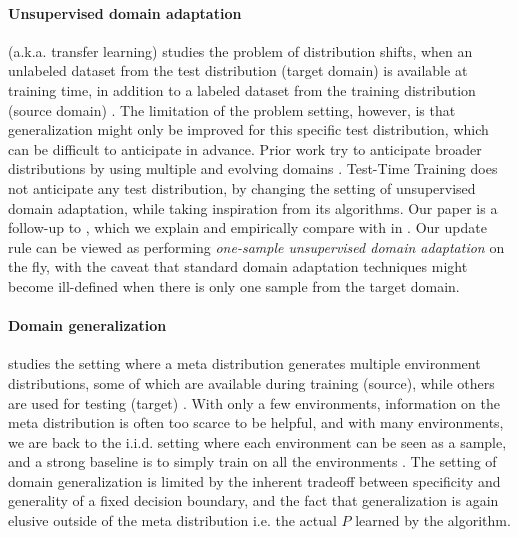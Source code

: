 \paragraph{Unsupervised domain adaptation}
(a.k.a. transfer learning) studies the problem of distribution shifts, when an unlabeled dataset from the test distribution (target domain) is available at training time, 
in addition to a labeled dataset from the training distribution (source domain)
\citep{chen2011co, gong2012geodesic, long2015learning, ganin2016domain, long2016unsupervised, tzeng2017adversarial,hoffman2017cycada,csurka2017domain, chen2018adversarial}.
The limitation of the problem setting, however, is that generalization might only be improved for this specific test distribution, which can be difficult to anticipate in advance.
Prior work try to anticipate broader distributions by using multiple and evolving domains \citep{hoffman2018algorithms, hoffman2012discovering, hoffman2014continuous}.
Test-Time Training does not anticipate any test distribution, by changing the setting of unsupervised domain adaptation, while taking inspiration from its algorithms.
Our paper is a follow-up to \citet{sun2019uda}, which we explain and empirically compare with in .
Our update rule can be viewed as performing \emph{one-sample unsupervised domain adaptation} on the fly, with the caveat that standard domain adaptation techniques might become ill-defined when there is only one sample from the target domain.

\paragraph{Domain generalization} studies the setting where a meta distribution generates multiple environment distributions, some of which are available during training (source), while others are used for testing (target)
\citep{li2018deep, shankar2018generalizing, muandet2013domain, balaji2018metareg, ghifary2015domain, motiian2017unified, li2017deeper, gan2016learning}. 
With only a few environments, information on the meta distribution is often too scarce to be helpful,
and with many environments, we are back to the i.i.d. setting where each environment can be seen as a sample, and a strong baseline is to simply train on all the environments \citep{li2019episodic}.
The setting of domain generalization is limited by the inherent tradeoff between specificity and generality of a fixed decision boundary, and the fact that generalization is again elusive outside of the meta distribution i.e. the actual $P$ learned by the algorithm.

